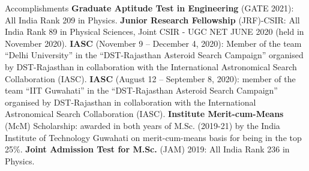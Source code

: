 \begin{rubric}{Accomplishments}
\entry*[] \textbf{Graduate Aptitude Test in Engineering} (GATE 2021): All India Rank 209 in Physics.
%
\entry*[] \textbf{Junior Research Fellowship} (JRF)-CSIR: All India Rank 89 in Physical Sciences, Joint CSIR - UGC NET JUNE 2020 (held in November 2020).
%
\entry*[] \textbf{IASC} (November 9 – December 4, 2020): Member of the team ``Delhi University'' in the ``DST-Rajasthan Asteroid Search Campaign'' organised by DST-Rajasthan in collaboration with the International Astronomical Search Collaboration (IASC).
%
\entry*[] \textbf{IASC} (August 12 – September 8, 2020): member of the team ``IIT Guwahati'' in the “DST-Rajasthan Asteroid Search Campaign” organised by DST-Rajasthan in collaboration with the International Astronomical Search Collaboration (IASC).
%
\entry*[] \textbf{Institute Merit-cum-Means} (McM) Scholarship: awarded in both years of M.Sc. (2019-21) by the India Institute of Technology Guwahati on merit-cum-means basis for being in the top 25\%.
%
\entry*[] \textbf{Joint Admission Test for M.Sc.} (JAM) 2019: All India Rank 236 in Physics.


\end{rubric}
